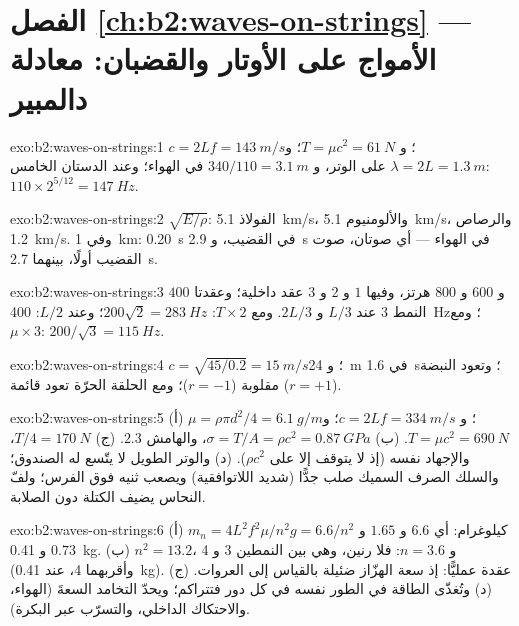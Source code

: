\section*{الفصل \ref{ch:b2:waves-on-strings} --- الأمواج على الأوتار والقضبان: معادلة دالمبير}

\begin{solution}{exo:b2:waves-on-strings:1}
$c = 2Lf = \qty{143}{m/s}$؛ و $T = \mu c^2 = \qty{61}{N}$؛ و $\lambda = 2L = \qty{1.3}{m}$ على
الوتر، و $340/110 = \qty{3.1}{m}$ في الهواء؛ وعند الدستان الخامس: $110 \times 2^{5/12} =
\qty{147}{Hz}$.
\end{solution}

\begin{solution}{exo:b2:waves-on-strings:2}
$\sqrt{E/\rho}$: الفولاذ \qty{5.1}{km/s}، والألومنيوم \qty{5.1}{km/s}، والرصاص
\qty{1.2}{km/s}. وفي \qty{1}{km}: \qty{0.20}{s} في القضيب، و \qty{2.9}{s} في الهواء ---
أي صوتان، صوت القضيب أولًا، بينهما \qty{2.7}{s}.
\end{solution}

\begin{solution}{exo:b2:waves-on-strings:3}
$400$ و $600$ و $800$ هرتز، وفيها $1$ و $2$ و $3$ عقد داخلية؛ وعقدتا النمط 3 عند
$L/3$ و $2L/3$. ومع $T \times 2$: $200\sqrt2 = \qty{283}{Hz}$؛ وعند $L/2$: \qty{400}{Hz}؛ ومع $\mu
\times 3$: $200/\sqrt3 = \qty{115}{Hz}$.
\end{solution}

\begin{solution}{exo:b2:waves-on-strings:4}
$c = \sqrt{45/0.2} = \qty{15}{m/s}$؛ و \qty{24}{m} في \qty{1.6}{s}؛ وتعود النبضة
مقلوبة ($r = -1$)؛ ومع الحلقة الحرّة تعود قائمة ($r = +1$).
\end{solution}

\begin{solution}{exo:b2:waves-on-strings:5}
(أ) $\mu = \rho\pi d^2/4 = \qty{6.1}{g/m}$؛ و $c = 2Lf = \qty{334}{m/s}$؛ و $T = \mu c^2 =
\qty{690}{N}$. (ب) $\sigma = T/A = \rho c^2 = \qty{0.87}{GPa}$، والهامش $2.3$. (ج) $T/4 =
\qty{170}{N}$، والإجهاد نفسه (إذ لا يتوقف إلا على $\rho c^2$). (د) والوتر الطويل
لا يتّسع له الصندوق؛ والسلك الصرف السميك صلب جدًّا (شديد
اللاتوافقية) ويصعب ثنيه فوق الفرس؛ ولفّ النحاس يضيف الكتلة
دون الصلابة.
\end{solution}

\begin{solution}{exo:b2:waves-on-strings:6}
(أ) $m_n = 4L^2f^2\mu/n^2g = 6.6/n^2$ كيلوغرام: أي $6.6$ و $1.65$ و $0.73$ و \qty{0.41}{kg}. (ب)
$n^2 = 13.2$، و $n = 3.6$: فلا رنين، وهي بين النمطين 3 و 4 (وأقربهما 4،
عند \qty{0.41}{kg}). (ج) عقدة عمليًّا: إذ سعة الهزّاز ضئيلة
بالقياس إلى العروات. (د) وتُغذّى الطاقة في الطور نفسه في كل دور
فتتراكم؛ ويحدّ التخامد السعةَ (الهواء، والاحتكاك الداخلي، والتسرّب
عبر البكرة).
\end{solution}


